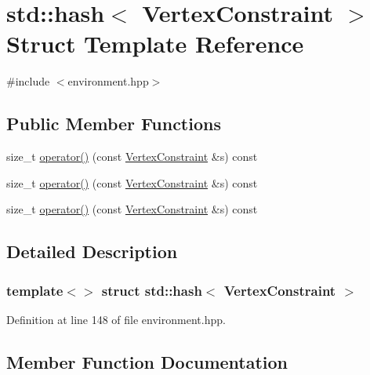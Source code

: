 \hypertarget{structstd_1_1hash_3_01_vertex_constraint_01_4}{}\section{std\+:\+:hash$<$ Vertex\+Constraint $>$ Struct Template Reference}
\label{structstd_1_1hash_3_01_vertex_constraint_01_4}


{\ttfamily \#include $<$environment.\+hpp$>$}

\subsection*{Public Member Functions}
\begin{DoxyCompactItemize}
\item 
size\+\_\+t \hyperlink{structstd_1_1hash_3_01_vertex_constraint_01_4_aea9029af41dea6bb20a7a1c8f7e4091c}{operator()} (const \hyperlink{structlib_multi_robot_planning_1_1_vertex_constraint}{Vertex\+Constraint} \&s) const
\item 
size\+\_\+t \hyperlink{structstd_1_1hash_3_01_vertex_constraint_01_4_aea9029af41dea6bb20a7a1c8f7e4091c}{operator()} (const \hyperlink{struct_vertex_constraint}{Vertex\+Constraint} \&s) const
\item 
size\+\_\+t \hyperlink{structstd_1_1hash_3_01_vertex_constraint_01_4_aea9029af41dea6bb20a7a1c8f7e4091c}{operator()} (const \hyperlink{struct_vertex_constraint}{Vertex\+Constraint} \&s) const
\end{DoxyCompactItemize}


\subsection{Detailed Description}
\subsubsection*{template$<$$>$\newline
struct std\+::hash$<$ Vertex\+Constraint $>$}



Definition at line 148 of file environment.\+hpp.



\subsection{Member Function Documentation}
\mbox{\label{structstd_1_1hash_3_01_vertex_constraint_01_4_aea9029af41dea6bb20a7a1c8f7e4091c}} 
